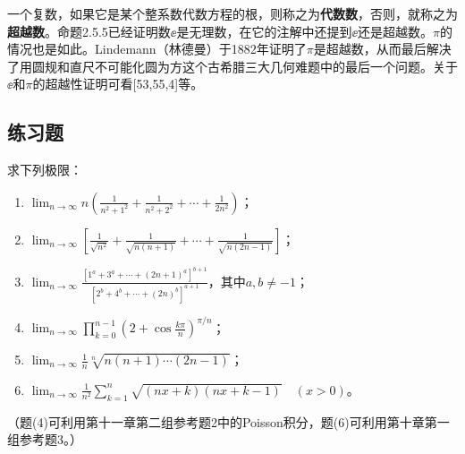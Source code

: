 一个复数，如果它是某个整系数代数方程的根，则称之为\textbf{代数数}，否则，就称之为\textbf{超越数}。命题2.5.5已经证明数$\ee$是无理数，在它的注解中还提到$\ee$还是超越数。$\pi$的情况也是如此。Lindemann（林德曼）于1882年证明了$\pi$是超越数，从而最后解决了用圆规和直尺不可能化圆为方这个古希腊三大几何难题中的最后一个问题。关于$\ee$和$\pi$的超越性证明可看[53,55,4]等。

\subsection{练习题}

\begin{xexercise}[1]
求下列极限：
  \begin{enumerate}[label=(\arabic*)]
    \item $\displaystyle\lim_{n\to\infty}n\left(\frac1{n^2+1^2}+\frac1{n^2+2^2}+\cdots+\frac1{2n^2}\right)$；
    \item $\displaystyle\lim_{n\to\infty}\left[\frac1{\sqrt{n^2}}+\frac1{\sqrt{n(n+1)}}+\cdots+\frac1{\sqrt{n(2n-1)}}\right]$；
    \item $\displaystyle\lim_{n\to\infty}\frac{[1^a+3^a+\cdots+(2n+1)^a]^{b+1}}{[2^b+4^b+\cdots+(2n)^b]^{a+1}}$，其中$a,b\ne-1$；
    \item $\displaystyle\lim_{n\to\infty}\prod_{k=0}^{n-1}\left(2+\cos\frac{k\pi}{n}\right)^{\pi/n}$；
    \item $\displaystyle\lim_{n\to\infty}\frac1n\sqrt[n]{n(n+1)\cdots(2n-1)}$；
    \item $\displaystyle\lim_{n\to\infty}\frac1{n^2}\sum_{k=1}^n\sqrt{(nx+k)(nx+k-1)}\quad(x>0)$。
  \end{enumerate}
  （题(4)可利用第十一章第二组参考题2中的Poisson积分，题(6)可利用第十章第一组参考题3。）
\end{xexercise}
